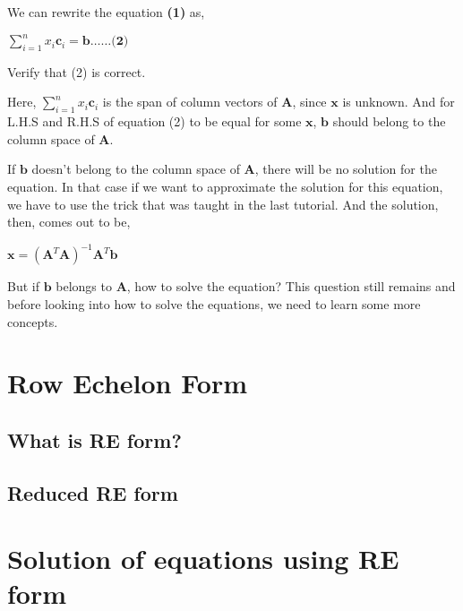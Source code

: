 \documentclass[a4paper]{article}
\begin{document}
We can rewrite the equation \textbf{(1)} as,

\begin{center}
    $
    \displaystyle\sum_{i=1}^{n}x_i\textbf{c}_i = \textbf{b} \dots\dots \textbf{(2)}
    $
\end{center}
Verify that (2) is correct.

Here, $\displaystyle\sum_{i=1}^{n}x_i\textbf{c}_i$ is the span of column vectors of $\textbf{A}$, since $\textbf{x}$ is unknown. And for L.H.S and R.H.S of equation (2) to be equal for some $\textbf{x}$, $\textbf{b}$ should belong to the column space of $\textbf{A}$.

If $\textbf{b}$ doesn't belong to the column space of $\textbf{A}$, there will be no solution for the equation. In that case if we want to approximate the solution for this equation, we have to use the trick that was taught in the last tutorial. And the solution, then, comes out to be,
\begin{center}
    $
    \textbf{x} = (\textbf{A}^T\textbf{A})^{-1}\textbf{A}^T\textbf{b}
    $
\end{center}

But if $\textbf{b}$ belongs to $\textbf{A}$, how to solve the equation? This question still remains and before looking into how to solve the equations, we need to learn some more concepts.

\section{Row Echelon Form}
\subsection{What is RE form?}

\subsection{Reduced RE form}

\section{Solution of equations using RE form}
\end{document}
